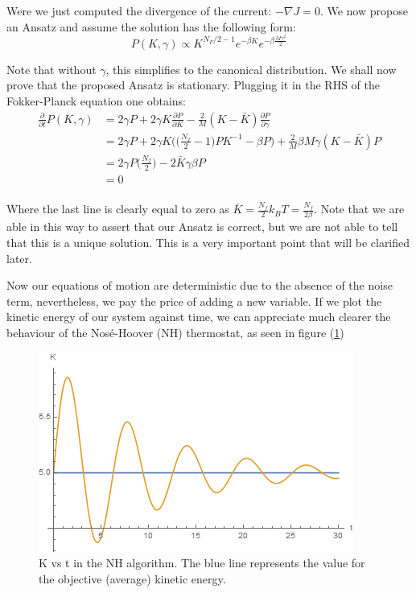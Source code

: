 Were we just computed the divergence of the current: $-\nabla J = 0$. We now propose an Ansatz and assume the solution has the following form:
\begin{equation}
    P(K,\gamma) \propto K^{N_F/2 -1}e^{-\beta K}e^{-\beta \frac{M\gamma ^2}{2} }
    \label{ansatznh}
\end{equation}

Note that without $\gamma$, this simplifies to the canonical distribution. We shall now prove that the proposed Ansatz is stationary. Plugging it in the RHS of the Fokker-Planck equation one obtains: 
\begin{align*}
\frac{\partial }{\partial t} P(K,\gamma) &= 2 \gamma P + 2 \gamma K \frac{\partial P}{\partial K} - \frac{2}{M}(K - \bar{K}) \frac{\partial P }{\partial \gamma} \\
&= 2\gamma P + 2\gamma K \Bigg( \bigg( \frac{N_f}{2} -1\bigg) P K^{-1} - \beta P\Bigg) + \frac{2}{M} \beta M \gamma (K - \bar{K}) P \\
&= 2 \gamma P \bigg( \frac{N_f}{2}\bigg) - 2 \bar{K} \gamma \beta P \\
&= 0
\end{align*} \\
Where the last line is clearly equal to zero as $\bar{K} = \frac{N_f}{2} k_B T = \frac{N_f}{2 \beta} $. Note that we are able in this way to assert that our Ansatz is correct, but we are not able to tell that this is a unique solution. This is a very important point that will be clarified later.

Now our equations of motion are deterministic due to the absence of the noise term, nevertheless, we pay the price of adding a new variable. If we plot the kinetic energy of our system against time, we can appreciate much clearer the behaviour of the Nosé-Hoover (NH) thermostat, as seen in figure (\ref{Kvtnh}) 

\begin{figure}[h!]
    \centering
    \includegraphics[scale = 0.7]{Thermostats/nose.png}
    \caption{K vs t in the NH algorithm. The blue line represents the value for the objective (average) kinetic energy.}
    \label{Kvtnh}
\end{figure}

